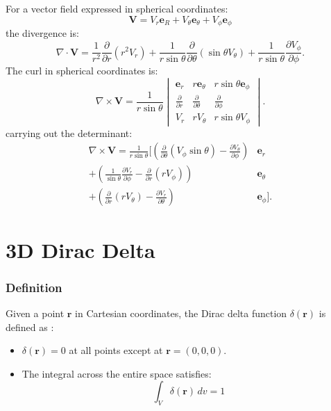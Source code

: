 For a vector field expressed in spherical coordinates:
\[
\mathbf{V} = V_r \mathbf{e}_R + V_\theta \mathbf{e}_{\theta} + V_\phi \mathbf{e}_\phi 
\]
the divergence is:
\begin{equation}
\nabla \cdot \mathbf{V} = \frac{1}{r^2} \frac{\partial}{\partial r} (r^2 V_r) + 
\frac{1}{r \sin \theta} \frac{\partial}{\partial \theta} (\sin \theta V_\theta) 
+ \frac{1}{r \sin \theta} \frac{\partial V_\phi}{\partial \phi}.
\end{equation}
The curl in spherical coordinates is:
\begin{equation}
\nabla \times \mathbf{V} = \frac{1}{r \sin \theta} \begin{vmatrix} 
    \mathbf{e}_r & r  \mathbf{e}_\theta & r \sin \theta  \mathbf{e}_\phi \\ 
    \frac{\partial}{\partial r} & \frac{\partial}{\partial \theta} & 
    \frac{\partial}{\partial \phi} \\ 
    V_r & r V_\theta & r \sin \theta V_\phi 
    \end{vmatrix}.
    \label{curl_spher}
\end{equation}
carrying out the determinant:
\begin{equation}
\begin{aligned}
\nabla \times \mathbf{V} = \frac{1}{r \sin \theta} \Bigg[ 
    \left( \frac{\partial}{\partial \theta} (V_\phi \sin \theta) - 
    \frac{\partial V_\theta}{\partial \phi} \right)  &\mathbf{e}_r \\
    + \left( \frac{1}{\sin \theta} \frac{\partial V_r}{\partial \phi} - 
    \frac{\partial}{\partial r} (r V_\phi) \right)  &\mathbf{e}_\theta \\
    + \left( \frac{\partial}{\partial r} (r V_\theta) - \frac{\partial V_r}{\partial 
    \theta} \right)  &\mathbf{e}_\phi 
\Bigg].
\end{aligned}
\end{equation}

\section{3D Dirac Delta}
\subsubsection{Definition}
Given a point \(\mathbf{r}\) in Cartesian coordinates, the Dirac delta function 
\(\delta(\mathbf{r})\) is defined as \cite{book-magnetism2}:
\begin{itemize}
    \item \(\delta(\mathbf{r}) = 0\) at all points except at \(\mathbf{r} = 
    (0,0,0)\).
    \item The integral across the entire space satisfies:
    \begin{equation}
    \int_V \delta(\mathbf{r}) \, dv = 1
    \label{eq:dirac}
    \end{equation}
\end{itemize}

